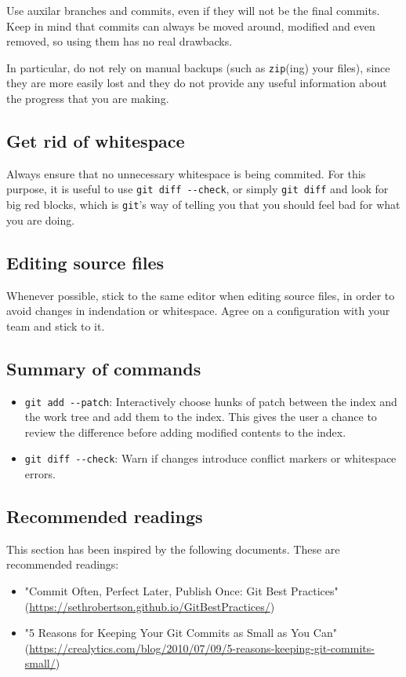 \documentclass{article}
\begin{document}
Use auxilar branches and commits, even if they will not be the
final commits. Keep in mind that commits can always be moved around, modified
and even removed, so using them has no real drawbacks.

In particular, do not rely on manual backups (such as \verb|zip|(ing) your
files), since they are more easily lost and they do not provide any useful
information about the progress that you are making.

\subsection{Get rid of whitespace}
Always ensure that no unnecessary whitespace is being commited. For
this purpose, it is useful to use \verb|git diff --check|, or simply
\verb|git diff| and look for big red blocks, which is \verb|git|'s way of
telling you that you should feel bad for what you are doing.

\subsection{Editing source files}
Whenever possible, stick to the same editor when editing source files, in order to avoid changes in
indendation or whitespace. Agree on a configuration with your team and stick to
it.

\subsection{Summary of commands}
\begin{itemize}
    \item \verb|git add --patch|: Interactively choose hunks of
        patch between the index and the work tree and add them to the index.
        This gives the user a chance to review the difference
       before adding modified contents to the index.
   \item \verb|git diff --check|: Warn if changes introduce conflict markers
       or whitespace errors.
\end{itemize}

\subsection{Recommended readings}
This section has been inspired by the following documents. These are
recommended readings:
\begin{itemize}
    \item "Commit Often, Perfect Later, Publish Once: Git Best Practices" (\url{https://sethrobertson.github.io/GitBestPractices/})
    \item "5 Reasons for Keeping Your Git Commits as Small as You Can"
        (\url{https://crealytics.com/blog/2010/07/09/5-reasons-keeping-git-commits-small/})
\end{itemize}
\end{document}
